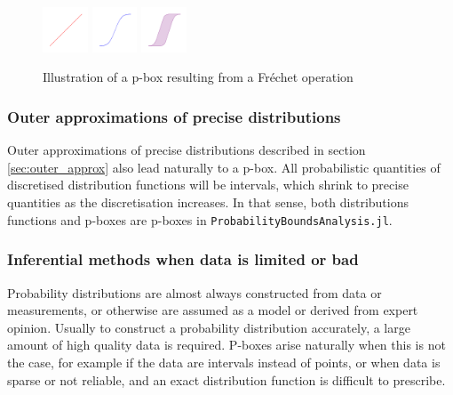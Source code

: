 \documentclass{juliacon}
\begin{document}
\begin{figure}[htp]

  \centering
  \includegraphics[width=0.12\textwidth]{../examples/JuliaCon/fig5/fig5_dist1.pdf}
  \includegraphics[width=0.12\textwidth]{../examples/JuliaCon/fig5/fig5_dist2.pdf}
  \raisebox{9.0mm}{{\Large$\rightarrow$}}
  \includegraphics[width=0.12\textwidth]{../examples/JuliaCon/fig5/fig5_pbox.pdf}
  

  \caption{Illustration of a p-box resulting from a Fréchet operation}
  \label{fig:figure5}
  
\end{figure}
\subsubsection{Outer approximations of precise distributions}
Outer approximations of precise distributions described in section \ref{sec:outer_approx} also lead naturally to a p-box. All probabilistic quantities of discretised distribution functions will be intervals, which shrink to precise quantities as the discretisation increases. In that sense, both distributions functions and p-boxes are p-boxes in \texttt{ProbabilityBoundsAnalysis.jl}.
\subsubsection{Inferential methods when data is limited or bad}
Probability distributions are almost always constructed from data or measurements, or otherwise are assumed as a model or derived from expert opinion. Usually to construct a probability distribution accurately, a large amount of high quality data is required. P-boxes arise naturally when this is not the case, for example if the data are intervals instead of points, or when data is sparse or not reliable, and an exact distribution function is difficult to prescribe.
\end{document}
